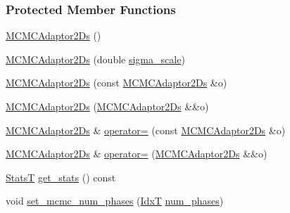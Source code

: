 \subsubsection*{Protected Member Functions}
\begin{DoxyCompactItemize}
\item 
\hyperlink{classmappel_1_1MCMCAdaptor2Ds_a60ff662736f3a1c75a46ac011773852f}{M\+C\+M\+C\+Adaptor2\+Ds} ()
\item 
\hyperlink{classmappel_1_1MCMCAdaptor2Ds_a0d18367ecbe399a7cbba834150b7debc}{M\+C\+M\+C\+Adaptor2\+Ds} (double \hyperlink{classmappel_1_1MCMCAdaptorBase_a76312f7d589bf3f3e754beca174b884b}{sigma\+\_\+scale})
\item 
\hyperlink{classmappel_1_1MCMCAdaptor2Ds_a5257f7894f098168a76c0e5da88f9bf6}{M\+C\+M\+C\+Adaptor2\+Ds} (const \hyperlink{classmappel_1_1MCMCAdaptor2Ds}{M\+C\+M\+C\+Adaptor2\+Ds} \&o)
\item 
\hyperlink{classmappel_1_1MCMCAdaptor2Ds_a670b8645789a66cd1865e90600f44602}{M\+C\+M\+C\+Adaptor2\+Ds} (\hyperlink{classmappel_1_1MCMCAdaptor2Ds}{M\+C\+M\+C\+Adaptor2\+Ds} \&\&o)
\item 
\hyperlink{classmappel_1_1MCMCAdaptor2Ds}{M\+C\+M\+C\+Adaptor2\+Ds} \& \hyperlink{classmappel_1_1MCMCAdaptor2Ds_a271813db8cfbca730d2ebd60b335b33e}{operator=} (const \hyperlink{classmappel_1_1MCMCAdaptor2Ds}{M\+C\+M\+C\+Adaptor2\+Ds} \&o)
\item 
\hyperlink{classmappel_1_1MCMCAdaptor2Ds}{M\+C\+M\+C\+Adaptor2\+Ds} \& \hyperlink{classmappel_1_1MCMCAdaptor2Ds_ad40d3e92611cf17bdb2d54662c959589}{operator=} (\hyperlink{classmappel_1_1MCMCAdaptor2Ds}{M\+C\+M\+C\+Adaptor2\+Ds} \&\&o)
\item 
\hyperlink{namespacemappel_a04ab395b0cf82c4ce68a36b2212649a5}{StatsT} \hyperlink{classmappel_1_1MCMCAdaptor2Ds_adc76529ede19684c1deacbeb8205fd8a}{get\+\_\+stats} () const 
\item 
void \hyperlink{classmappel_1_1MCMCAdaptorBase_ad6c75e327e8732abc2654492f372563a}{set\+\_\+mcmc\+\_\+num\+\_\+phases} (\hyperlink{namespacemappel_ab17ec0f30b61ece292439d7ece81d3a8}{IdxT} \hyperlink{classmappel_1_1MCMCAdaptorBase_a44b90a984ace712584074dc17831fe25}{num\+\_\+phases})
\end{DoxyCompactItemize}
